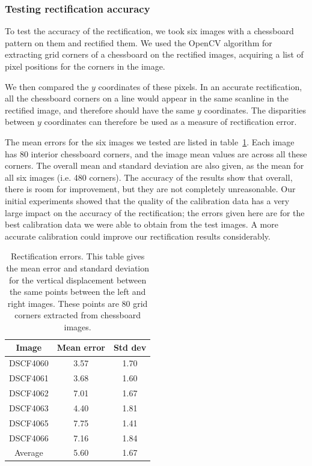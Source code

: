 \subsubsection{Testing rectification accuracy}
To test the accuracy of the rectification, we took six images with a chessboard pattern on them and rectified them. We used the OpenCV algorithm for extracting grid corners of a chessboard on the rectified images, acquiring a list of pixel positions for the corners in the image.

We then compared the $y$ coordinates of these pixels. In an accurate rectification, all the chessboard corners on a line would appear in the same scanline in the rectified image, and therefore should have the same $y$ coordinates. The disparities between $y$ coordinates can therefore be used as a measure of rectification error.

The mean errors for the six images we tested are listed in
table~\ref{tab:rectification-error}. Each image has 80 interior chessboard corners, and the image mean values are across all these corners. The overall
mean and standard deviation are also given, as the mean for all six images (i.e.
480 corners). The accuracy of the results show that overall, there is room for improvement, but they are not completely unreasonable. Our initial experiments showed that
the quality of the calibration data has a very large impact on the accuracy of the
rectification; the errors given here are for the best calibration data we were
able to obtain from the test images. A more accurate calibration could improve our rectification results considerably.

\begin{table}[h]
  \centering
  \begin{tabular}{c c c}
    \toprule
    Image & Mean error & Std dev \\
    \midrule
    DSCF4060 & 3.57  & 1.70 \\
    DSCF4061 & 3.68  & 1.60 \\
    DSCF4062 & 7.01  & 1.67 \\
    DSCF4063 & 4.40  & 1.81 \\
    DSCF4065 & 7.75  & 1.41 \\
    DSCF4066 & 7.16  & 1.84 \\
    \midrule
    Average  & 5.60  & 1.67 \\
    \bottomrule
  \end{tabular}
  \caption[Rectification errors]{Rectification errors. This table gives the mean error and
    standard deviation for the vertical displacement between the same points
    between the left and right images. These points are 80 grid corners extracted from chessboard images.}
  \label{tab:rectification-error}
\end{table}
